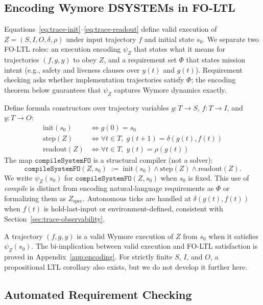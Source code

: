 \subsection{Encoding Wymore DSYSTEMs in FO-LTL}
\label{sec:dsystem-encoding}

Equations~\eqref{eq:trace-init}--\eqref{eq:trace-readout} define valid execution of $Z = (S,I,O,\delta,\rho)$ under input trajectory $f$ and initial state $s_0$. We separate two FO-LTL roles: an execution encoding $\psi_Z$ that states what it means for trajectories $(f,g,y)$ to obey $Z$, and a requirement set $\Phi$ that states mission intent (e.g., safety and liveness clauses over $y(t)$ and $g(t)$). Requirement checking asks whether implementation trajectories satisfy $\Phi$; the encoding theorem below guarantees that $\psi_Z$ captures Wymore dynamics exactly.

Define formula constructors over trajectory variables $g : T \to S$, $f : T \to I$, and $y : T \to O$:
\begin{align}
    \text{init}(s_0) &\Leftrightarrow g(0) = s_0 \label{eq:fo-init}\\
    \text{step}(Z) &\Leftrightarrow \forall t \in T,\; g(t{+}1) = \delta(g(t), f(t)) \label{eq:fo-step}\\
    \text{readout}(Z) &\Leftrightarrow \forall t \in T,\; y(t) = \rho(g(t)) \label{eq:fo-readout}
\end{align}
The map $\texttt{compileSystemFO}$ is a structural compiler (not a solver):
\[
    \texttt{compileSystemFO}(Z, s_0) \;:=\; \text{init}(s_0) \wedge \text{step}(Z) \wedge \text{readout}(Z).
\]
We write $\psi_Z(s_0)$ for $\texttt{compileSystemFO}(Z,s_0)$ when $s_0$ is fixed. This use of \emph{compile} is distinct from encoding natural-language requirements as $\Phi$ or formalizing them as $Z_{\text{spec}}$. Autonomous ticks are handled at $\delta(g(t), f(t))$ when $f(t)$ is hold-last-input or environment-defined, consistent with Section~\ref{sec:trace-observability}.

A trajectory $(f,g,y)$ is a valid Wymore execution of $Z$ from $s_0$ when it satisfies $\psi_Z(s_0)$. The bi-implication between valid execution and FO-LTL satisfaction is proved in Appendix~\ref{app:encoding}. For strictly finite $S$, $I$, and $O$, a propositional LTL corollary also exists, but we do not develop it further here.

\subsection{Automated Requirement Checking}
\label{sec:automated-checking}

